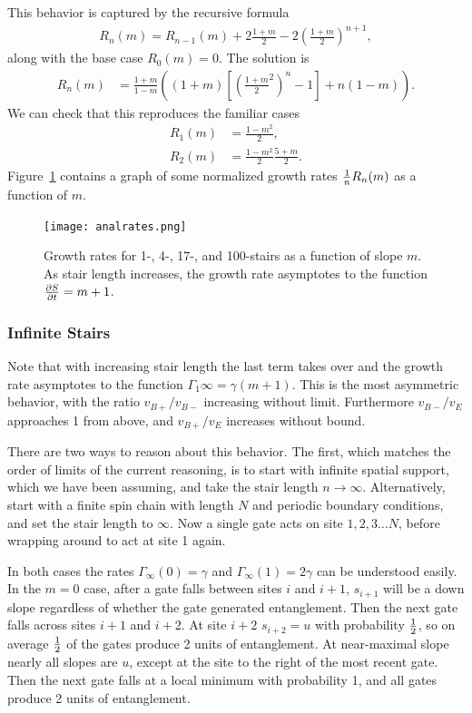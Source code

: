 This behavior is captured by the recursive formula
\begin{align}
R_n(m) = R_{n-1}(m)+2\frac{1+m}{2} - 2\left(\frac{1+m}{2}\right)^{n+1}, \label{eqn:raterecur}
\end{align}
along with the base case $R_0(m)=0$. The solution is
\begin{align}
R_n(m) &=\frac{1+m}{1-m}\left((1+m)\left[\left(\frac{1+m}{2}^2
	\right)^n-1\right]+n(1-m)\right).
\end{align}
We can check that this reproduces the familiar cases
\begin{align}
R_1(m) &= \frac{1-m^2}{2},\\
R_2(m) &= \frac{1-m^2}{2}\frac{5+m}{2}.
\end{align}
Figure~\ref{fig:growthrates} contains a graph of some normalized growth rates $\frac{1}{n}R_n(m)$ as a function of $m$.

\begin{figure}
	\centering
	\texttt{[image: analrates.png]}
	\caption{Growth rates for 1-, 4-, 17-, and 100-stairs as a function of slope $m$. As stair length increases, the growth rate asymptotes to the function $\frac{\partial S}{\partial t} = m+1$.}
	\label{fig:growthrates}
\end{figure}

\subsubsection{Infinite Stairs}

Note that with increasing stair length the last term takes over and the growth rate asymptotes to the function $\Gamma_1\infty = \gamma(m+1)$. This is the most asymmetric behavior, with the ratio $v_{B+}/v_{B-}$ increasing without limit. Furthermore $v_{B-}/v_E$ approaches 1 from above, and $v_{B+}/v_E$ increases without bound.

There are two ways to reason about this behavior. The first, which matches the order of limits of the current reasoning, is to start with infinite spatial support, which we have been assuming, and take the stair length $n\to\infty$. 
Alternatively, start with a finite spin chain with length $N$ and periodic boundary conditions, and set the stair length to $\infty$. Now a single gate acts on site $1,2,3\dots N$, before wrapping around to act at site 1 again. 

In both cases the rates $\Gamma_\infty(0)=\gamma$ and $\Gamma_\infty(1) = 2\gamma$ can be understood easily. In the $m=0$ case, after a gate falls between sites $i$ and $i+1$, $s_{i+1}$ will be a down slope regardless of whether the gate generated entanglement. Then the next gate falls across sites $i+1$ and $i+2$. At site $i+2$ $s_{i+2}=u$ with probability $\frac{1}{2}$, so on average $\frac{1}{2}$ of the gates produce 2 units of entanglement. At near-maximal slope nearly all slopes are $u$, except at the site to the right of the most recent gate. Then the next gate falls at a local minimum with probability 1, and all gates produce 2 units of entanglement.

